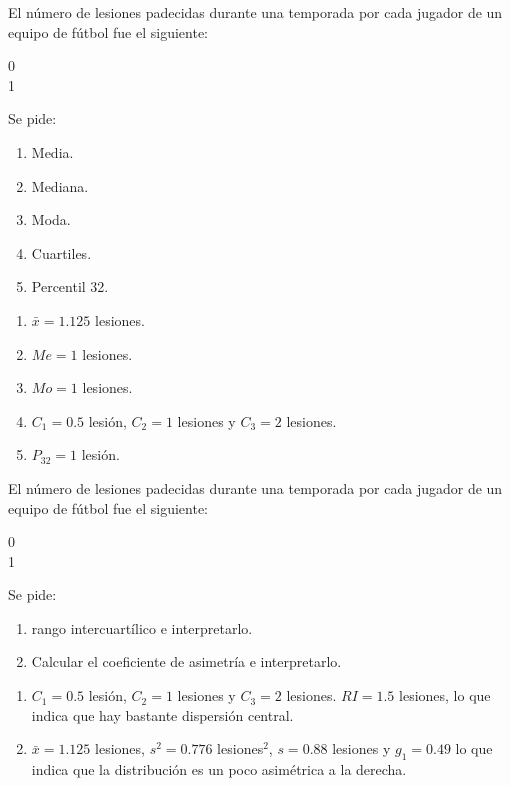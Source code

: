 {El número de lesiones padecidas durante una temporada por cada jugador de un equipo de fútbol fue el siguiente:
\begin{center}
0            \\
1           
\end{center}
Se pide:
\begin{enumerate}
\item Media.
\item Mediana.
\item Moda.
\item Cuartiles.
\item Percentil 32.
\end{enumerate}
}
{\begin{enumerate}
\item $\bar{x}= 1.125$ lesiones.
\item $Me=1$ lesiones.
\item $Mo=1$ lesiones.
\item $C_1 = 0.5$ lesión, $C_2=1$ lesiones y $C_3=2$ lesiones.
\item $P_{32}=1$ lesión.
\end{enumerate}
}
{}


{El número de lesiones padecidas durante una temporada por cada jugador de un equipo de fútbol fue el siguiente:
\begin{center}
0            \\
1           
\end{center}
Se pide:
\begin{enumerate}
\item rango intercuartílico e interpretarlo.
\item Calcular el coeficiente de asimetría e interpretarlo.
\end{enumerate}
}
{\begin{enumerate}
\item $C_1 = 0.5$ lesión, $C_2=1$ lesiones y $C_3=2$ lesiones. $RI=1.5$ lesiones, lo que indica que hay bastante dispersión central.
\item $\bar{x}= 1.125$ lesiones, $s^2= 0.776$ lesiones$^2$, $s= 0.88$ lesiones y $g_1=0.49$ lo que indica que la distribución es un poco asimétrica a la derecha.
\end{enumerate}
}
{}



